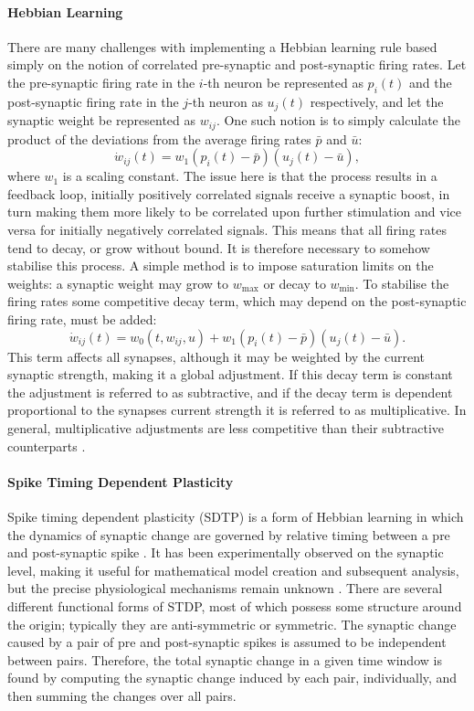 \paragraph{Hebbian Learning}
There are many challenges with implementing a Hebbian learning rule based simply on the notion of correlated pre-synaptic and post-synaptic firing rates. Let the pre-synaptic firing rate in the $i$-th neuron be represented as $p_i(t)$ and the post-synaptic firing rate in the $j$-th neuron as $u_j(t)$ respectively, and let the synaptic weight be represented as $w_{ij}$. One such notion is to simply calculate the product of the deviations from the average firing rates $\bar{p}$ and $\bar{u}$:
\begin{equation}
\dot{w}_{ij}(t) = w_1(p_i(t)-\bar{p})(u_j(t)-\bar{u}),
\end{equation}
where $w_1$ is a scaling constant. The issue here is that the process results in a feedback loop, initially positively correlated signals receive a synaptic boost, in turn making them more likely to be correlated upon further stimulation and vice versa for initially negatively correlated signals. This means that all firing rates tend to decay, or grow without bound. It is therefore necessary to somehow stabilise this process. A simple method is to impose saturation limits on the weights: a synaptic weight may grow to $w_{\text{max}}$ or decay to $w_{\text{min}}$. To stabilise the firing rates some competitive decay term, which may depend on the post-synaptic firing rate,  must be added:
\begin{equation}
\dot{w}_{ij}(t) = w_0(t,w_{ij},u) + w_1(p_i(t)-\bar{p})(u_j(t)-\bar{u}).
\end{equation}
This term affects all synapses, although it may be weighted by the current synaptic strength, making it a global adjustment. If this decay term is constant the adjustment is referred to as subtractive, and if the decay term is dependent proportional to the synapses current strength it is referred to as multiplicative. In general, multiplicative adjustments are less competitive than their subtractive counterparts \cite{Abbott2000-gl}.
\paragraph{Spike Timing Dependent Plasticity \label{sec:nftplsaticity}}
Spike timing dependent plasticity (SDTP) is a form of Hebbian learning in which the dynamics of synaptic change are governed by relative timing between a pre and post-synaptic spike \cite{Abbott2000-gl}. It has been experimentally observed on the synaptic level, making it useful for mathematical model creation and subsequent analysis, but the precise physiological mechanisms remain unknown \cite{Froemke2002-be, Zhang2000-lb}. There are several different functional forms of STDP, most of which possess some structure around the origin; typically they are anti-symmetric or symmetric. The synaptic change caused by a pair of pre and post-synaptic spikes is assumed to be independent between pairs. Therefore, the total synaptic change in a given time window is found by computing the synaptic change induced by each pair, individually, and then summing the changes over all pairs.

